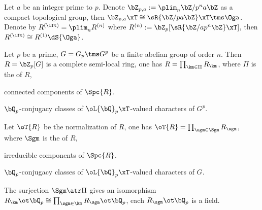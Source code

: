 \documentclass[article, a4paper, twoside]{universal}
\begin{document}

\begin{cmt}
\begin{stp}
	Let $a$ be an integer prime to $p$. Denote $\bZ_{p,a}:=\plim_{n}\bZ/p^{n}a\bZ$ as a compact topological group, then $\bZ_{p,a}\xT\cong\sR{\bZ/pa\bZ}\xT\tms\Oga$. Denote by $R^{(\ift)}=\plim_{n}R^{(n)}$ where $R^{(n)}:=\bZ_{p}[\sR{\bZ/ap^{n}\bZ}\xT]$, then $R^{(\ift)}\cong R^{(1)}\dS{\Oga}$.
	\begin{thm}[{\cite[Page~195]{MW1984}}]
		Let $p$ be a prime, $G=G_{p}\tms G^{p}$ be a finite abelian group of order $n$. Then $R=\bZ_{p}[G]$ is a complete semi-local ring, one has $R=\prod_{\km\in\Pi}R_{\km}$, where $\Pi$ is the  of $R$,
		\begin{itm}
			\item connected components of $\Spc{R}$.
			\item $\bQ_{p}$-conjugacy classes of $\oL{\bQ}_{p}\xT$-valued characters of $G^{p}$.
		\end{itm}
		Let $\oT{R}$ be the normalization of $R$, one has $\oT{R}=\prod_{\sgm\in\Sgm}R_{\sgm}$, where $\Sgm$ is the  of $R$,
		\begin{itm}
			\item irreducible components of $\Spc{R}$.
			\item $\bQ_{p}$-conjugacy classes of $\oL{\bQ}_{p}\xT$-valued characters of $G$.
		\end{itm}
		The surjection $\Sgm\atr\Pi$ gives an isomorphism $R_{\km}\ot\bQ_{p}\cong\prod_{\sgm\in\km}R_{\sgm}\ot\bQ_{p}$, each $R_{\sgm}\ot\bQ_{p}$ is a field.
	\end{thm}
\end{stp}
\end{cmt}
\end{document}
